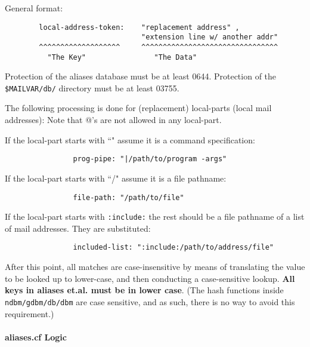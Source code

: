 General format:

\begin{verbatim}
        local-address-token:    "replacement address" ,
                                "extension line w/ another addr"
        ^^^^^^^^^^^^^^^^^^^     ^^^^^^^^^^^^^^^^^^^^^^^^^^^^^^^^
          "The Key"                "The Data"
\end{verbatim}

Protection of the aliases database must be at least 0644.
Protection of the {\tt \$MAILVAR/db/} directory must be at least 03755.



The following processing is done for (replacement) local-parts
(local mail addresses):  Note that @'s are not allowed in any local-part.



If the local-part starts with ``{\verbar}" assume it is a command specification:
\begin{verbatim}
                prog-pipe: "|/path/to/program -args"
\end{verbatim}

If the local-part starts with ``/" assume it is a file pathname:
\begin{verbatim}
                file-path: "/path/to/file"
\end{verbatim}

If the local-part starts with {\tt :include:} the rest should be a file
pathname of a list of mail addresses.  They are substituted:
\begin{verbatim}
                included-list: ":include:/path/to/address/file"
\end{verbatim}

After this point, all matches are case-insensitive by means of translating
the value to be looked up to lower-case, and then conducting a case-sensitive
lookup. {\bf All keys in aliases et.al. must be in lower case}.
(The hash functions inside  {\tt ndbm/gdbm/db/dbm}  are case sensitive, and 
as such, there is no way to avoid this requirement.)




\paragraph{aliases.cf Logic}



